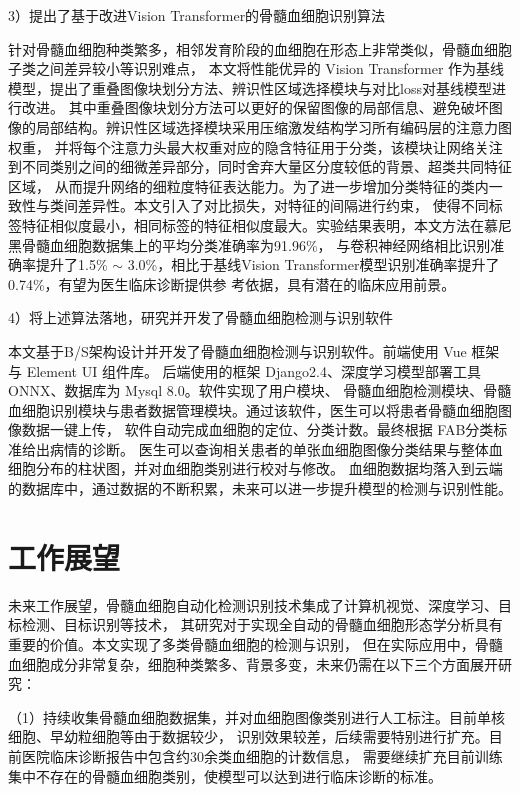 3）提出了基于改进Vision Transformer的骨髓血细胞识别算法

针对骨髓血细胞种类繁多，相邻发育阶段的血细胞在形态上非常类似，骨髓血细胞子类之间差异较小等识别难点，
本文将性能优异的 Vision Transformer 作为基线模型，提出了重叠图像块划分方法、辨识性区域选择模块与对比loss对基线模型进行改进。
其中重叠图像块划分方法可以更好的保留图像的局部信息、避免破坏图像的局部结构。辨识性区域选择模块采用压缩激发结构学习所有编码层的注意力图权重，
并将每个注意力头最大权重对应的隐含特征用于分类，该模块让网络关注到不同类别之间的细微差异部分，同时舍弃大量区分度较低的背景、超类共同特征区域，
从而提升网络的细粒度特征表达能力。为了进一步增加分类特征的类内一致性与类间差异性。本文引入了对比损失，对特征的间隔进行约束，
使得不同标签特征相似度最小，相同标签的特征相似度最大。实验结果表明，本文方法在慕尼黑骨髓血细胞数据集上的平均分类准确率为91.96\%，
与卷积神经网络相比识别准确率提升了1.5\% $\sim$ 3.0\%，相比于基线Vision Transformer模型识别准确率提升了0.74\%，有望为医生临床诊断提供参
考依据，具有潜在的临床应用前景。

4）将上述算法落地，研究并开发了骨髓血细胞检测与识别软件

本文基于B/S架构设计并开发了骨髓血细胞检测与识别软件。前端使用 Vue 框架与 Element UI 组件库。
后端使用的框架 Django2.4、深度学习模型部署工具 ONNX、数据库为 Mysql 8.0。软件实现了用户模块、
骨髓血细胞检测模块、骨髓血细胞识别模块与患者数据管理模块。通过该软件，医生可以将患者骨髓血细胞图像数据一键上传，
软件自动完成血细胞的定位、分类计数。最终根据 FAB分类标准给出病情的诊断。
医生可以查询相关患者的单张血细胞图像分类结果与整体血细胞分布的柱状图，并对血细胞类别进行校对与修改。
血细胞数据均落入到云端的数据库中，通过数据的不断积累，未来可以进一步提升模型的检测与识别性能。

\section{工作展望}

未来工作展望，骨髓血细胞自动化检测识别技术集成了计算机视觉、深度学习、目标检测、目标识别等技术，
其研究对于实现全自动的骨髓血细胞形态学分析具有重要的价值。本文实现了多类骨髓血细胞的检测与识别，
但在实际应用中，骨髓血细胞成分非常复杂，细胞种类繁多、背景多变，未来仍需在以下三个方面展开研究：

（1）持续收集骨髓血细胞数据集，并对血细胞图像类别进行人工标注。目前单核细胞、早幼粒细胞等由于数据较少，
识别效果较差，后续需要特别进行扩充。目前医院临床诊断报告中包含约30余类血细胞的计数信息，
需要继续扩充目前训练集中不存在的骨髓血细胞类别，使模型可以达到进行临床诊断的标准。

